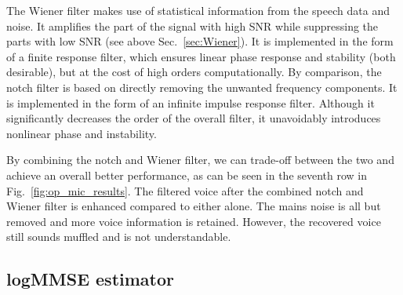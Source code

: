 \documentclass[aps,pra,superscriptaddress,reprint]{revtex4-2}
\begin{document}
The Wiener filter makes use of statistical information from the speech data and noise. It amplifies the part of the signal with high SNR while suppressing the parts with low SNR (see above Sec.~\ref{sec:Wiener}). It is implemented in the form of a finite response filter, which ensures linear phase response and stability (both desirable), but at the cost of high orders computationally. By comparison, the notch filter is based on directly removing the unwanted frequency components. It is implemented in the form of an infinite impulse response filter. Although it significantly decreases the order of the overall filter, it unavoidably introduces nonlinear phase and instability. 


By combining the notch and Wiener filter, we can trade-off between the two and achieve an overall better performance, as can be seen in the seventh row in Fig.~\ref{fig:op_mic_results}.
The filtered voice after the combined notch and Wiener filter is enhanced compared to either alone. 
The mains noise is all but removed and more voice information is retained. 
However, the recovered voice still sounds muffled and is not understandable.





\subsection{logMMSE estimator}
\label{sec:logmmse}
\end{document}
